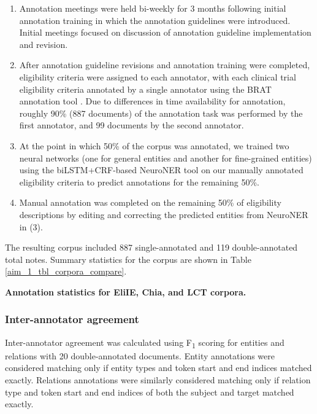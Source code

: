 \documentclass[../main.tex]{subfiles}
\begin{document}
\begin{enumerate}
    \item Annotation meetings were held bi-weekly for 3 months following initial annotation training in which the annotation guidelines were introduced. Initial meetings focused on discussion of annotation guideline implementation and revision.
    \item After annotation guideline revisions and annotation training were completed, eligibility criteria were assigned to each annotator, with each clinical trial eligibility criteria annotated by a single annotator using the BRAT annotation tool \cite{stenetorp2012brat}. Due to differences in time availability for annotation, roughly 90\% (887 documents) of the annotation task was performed by the first annotator, and 99 documents by the second annotator.
    \item At the point in which 50\% of the corpus was annotated, we trained two neural networks (one for general entities and another for fine-grained entities) using the biLSTM+CRF-based NeuroNER tool \cite{dernoncourt2017neuroner} on our manually annotated eligibility criteria to predict annotations for the remaining 50\%.
    \item Manual annotation was completed on the remaining 50\% of eligibility descriptions by editing and correcting the predicted entities from NeuroNER in (3).

\end{enumerate}    
    
The resulting corpus included 887 single-annotated and 119 double-annotated total notes. Summary statistics for the corpus are shown in Table \ref{aim_1_tbl_corpora_compare}.

\begin{table}[h!]
\centering
  
  \caption{\textbf{Annotation statistics for EliIE, Chia, and LCT corpora.}}
  \label{aim_1_tbl_corpora_compare}
\end{table}

\subsubsection{Inter-annotator agreement}
Inter-annotator agreement was calculated using F\textsubscript{1} scoring for entities and relations with 20 double-annotated documents. Entity annotations were considered matching only if entity types and token start and end indices matched exactly. Relations annotations were similarly considered matching only if relation type and token start and end indices of both the subject and target matched exactly.
\end{document}
